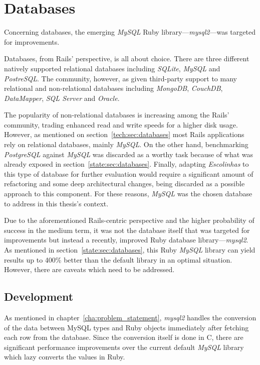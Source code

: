 \section{Databases} %
\label{solution:sec:databases}

Concerning databases, the emerging \textit{MySQL} Ruby library---\textit{mysql2}---was targeted for improvements.

Databases, from Rails' perspective, is all about choice. There are three different natively supported relational databases including \textit{SQLite}, \textit{MySQL} and \textit{PostreSQL}. The community, however, as given third-party support to many relational and non-relational databases including \textit{MongoDB}, \textit{CouchDB}, \textit{DataMapper}, \textit{SQL Server} and \textit{Oracle}.

The popularity of non-relational databases is increasing among the Rails' community, trading enhanced read and write speeds for a higher disk usage. However, as mentioned on section~\ref{tech:sec:databases} most Rails applications rely on relational databases, mainly \textit{MySQL}. On the other hand, benchmarking \textit{PostgreSQL} against \textit{MySQL} was discarded as a worthy task because of what was already exposed in section~\ref{state:sec:databases}. Finally, adapting \textit{Escolinhas} to this type of database for further evaluation would require a significant amount of refactoring and some deep architectural changes, being discarded as a possible approach to this component. For these reasons, \textit{MySQL} was the chosen database to address in this thesis's context.

Due to the aforementioned Rails-centric perspective and the higher probability of success in the medium term, it was not the database itself that was targeted for improvements but instead a recently, improved Ruby database library---\textit{mysql2}. As mentioned in section~\ref{state:sec:databases}, this Ruby \textit{MySQL} library can yield results up to 400\% better than the default library in an optimal situation. However, there are caveats which need to be addressed.

\subsection{Development}
As mentioned in chapter~\ref{cha:problem_statement}, \textit{mysql2} handles the conversion of the data between MySQL types and Ruby objects immediately after fetching each row from the database. Since the conversion itself is done in C, there are significant performance improvements over the current default \textit{MySQL} library which lazy converts the values in Ruby. 

